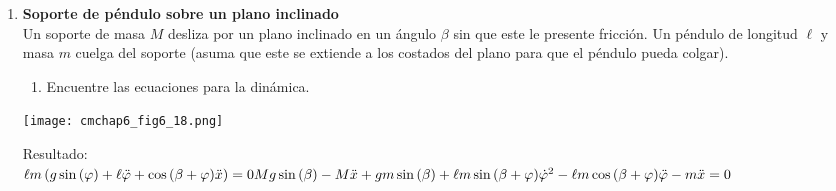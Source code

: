 \documentclass[11pt, a4paper, twoside]{article}
\begin{document}
\begin{enumerate}
\item
	\begin{minipage}[t][3.5cm]{0.7\textwidth}
		\textbf{Soporte de péndulo sobre un plano inclinado}\\
		Un soporte de masa \(M\) desliza por un plano inclinado en un ángulo \(\beta\) sin que este le presente fricción.
		Un péndulo de longitud \(\ell\) y masa \(m\) cuelga del soporte (asuma que este se extiende a los costados del plano para que el péndulo pueda colgar).
		\begin{enumerate}
			\item Encuentre las ecuaciones para la dinámica.
		\end{enumerate}
	\end{minipage}
	\begin{minipage}[c][1cm][t]{0.3\textwidth}
		\texttt{[image: cmchap6\_fig6\_18.png]}
	\end{minipage}
	Resultado:\\
	\(
		\ell m \left(g \sin{\left(\varphi \right)} + \ell \ddot{\varphi} + \cos{\left(\beta + \varphi \right)} \ddot{x}\right) = 0 \\
		M g \sin{\left(\beta \right)} - M \ddot{x} + g m \sin{\left(\beta \right)} + \ell m \sin{\left(\beta + \varphi \right)} \dot{\varphi}^{2} - \ell m \cos{\left(\beta + \varphi \right)} \ddot{\varphi} - m \ddot{x} = 0
	\)




\end{enumerate}
\end{document}
